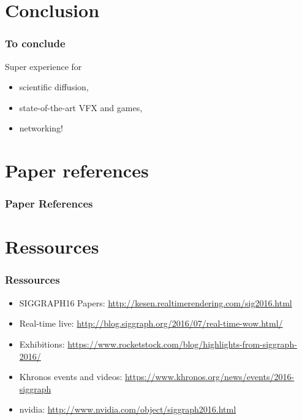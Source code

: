 
\section{Conclusion}
\frame
{
	\frametitle{To conclude}
	
	Super experience for 
	\begin{itemize}
		\item scientific diffusion, 
		\item state-of-the-art VFX and games, 
		\item networking!
	\end{itemize}
	
}
\section{Paper references}
\frame
{
	
  \frametitle{Paper References}
  
  

}
\section{Ressources}
\frame
{
	\frametitle{Ressources}
	\begin{itemize}
		\item SIGGRAPH16 Papers: \url{http://kesen.realtimerendering.com/sig2016.html}
		\item Real-time live:  \url{http://blog.siggraph.org/2016/07/real-time-wow.html/}
		\item Exhibitions:  \url{https://www.rocketstock.com/blog/highlights-from-siggraph-2016/}
		\item Khronos events and videos:  \url{https://www.khronos.org/news/events/2016-siggraph}
		\item nvidia:  \url{http://www.nvidia.com/object/siggraph2016.html}
	\end{itemize}
}